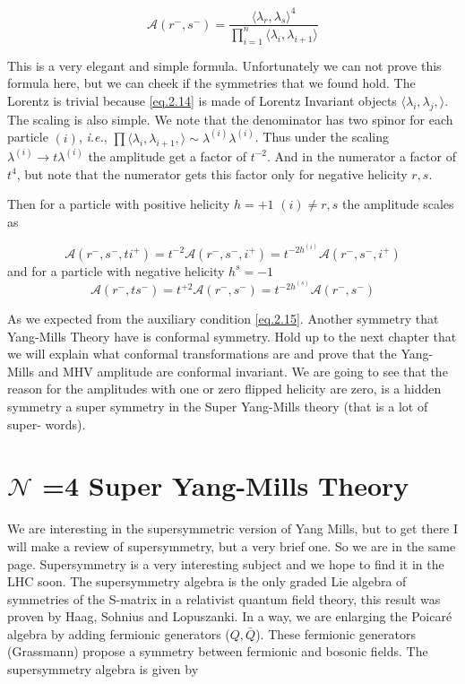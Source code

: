  \begin{equation}
 \mathcal{A}(r^{-},s^{-}) = \frac{\langle \lambda_{r},\lambda_{s}\rangle ^{4}}{\prod_{i=1}^{n}\langle \lambda_{i},\lambda_{i+1}\rangle}
 \label{eq.2.14}
 \end{equation}
 
 

This is a very elegant and simple formula. Unfortunately we can not prove this formula here, but we can cheek if the symmetries that we found hold. The Lorentz is trivial because \eqref{eq.2.14} is made of Lorentz Invariant objects $\langle \lambda_{i},\lambda_{j},\rangle$. The scaling is also simple. We note that the denominator has two spinor for each particle $(i)$, \textit{i.e.}, $\prod\langle \lambda_{i},\lambda_{i+1},\rangle \sim \lambda^{(i)}\lambda^{(i)}$. Thus under the scaling $\lambda^{(i)} \rightarrow t \lambda^{(i)}$ the amplitude get a factor of $t^{-2}$. And in the numerator a factor of $t^{4}$, but note that the numerator gets this factor only for negative helicity $r,s$.

Then for a particle with positive helicity $h = +1$ $(i) \neq r,s$ the amplitude scales as

\begin{equation}
\mathcal{A}(r^{-},s^{-},ti^{+}) =t^{-2}\mathcal{A}(r^{-},s^{-},i^{+}) = t^{-2h^{(i)}}\mathcal{A}(r^{-},s^{-},i^{+})  
\end{equation}
and for a particle with negative helicity $h^{s}= -1$
\begin{equation}
\mathcal{A}(r^{-},ts^{-}) =t^{+2}\mathcal{A}(r^{-},s^{-}) = t^{-2h^{(s)}}\mathcal{A}(r^{-},s^{-})  
\end{equation}

As we expected from the auxiliary condition \eqref{eq.2.15}. Another symmetry that Yang-Mills Theory have is conformal symmetry. Hold up to the next chapter that we will explain what conformal transformations are and prove that the Yang-Mills and  MHV amplitude are conformal invariant.
We are going to see that the reason for the amplitudes  with one or zero flipped helicity are zero, is a hidden symmetry a super symmetry in the Super Yang-Mills theory (that is a lot of super- words).

 \section{$\mathcal{N}$ =4 Super Yang-Mills Theory}
 
 
 
We are interesting in the supersymmetric version of Yang Mills, but to get there I will make a review of supersymmetry, but a very brief one. So we are in the same page.
Supersymmetry is a very interesting subject and we hope to find it in the LHC soon. The supersymmetry algebra is the only graded Lie algebra of symmetries of the S-matrix in a relativist quantum field theory, this result was proven by Haag, Sohnius and Lopuszanki. In a way, we are enlarging the Poicar\'{e} algebra by adding fermionic generators ($Q,\bar{Q}$). These fermionic generators (Grassmann) propose a symmetry between fermionic and bosonic fields.
The supersymmetry algebra is given by 

